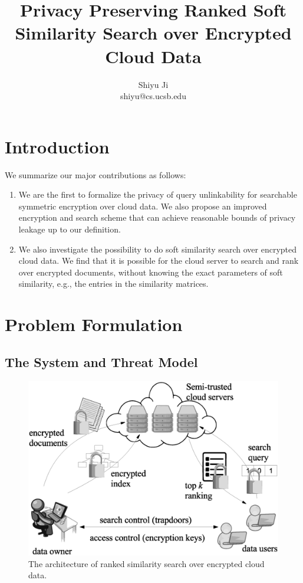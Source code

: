 \documentclass{IEEEtran}
\begin{document}
\title{\Large\bf Privacy Preserving Ranked Soft Similarity Search over Encrypted Cloud Data}
\author{Shiyu Ji\\ shiyu@cs.ucsb.edu}
\date{}
\maketitle

\newtheorem{definition}{Definition}
\theoremstyle{definition}
\newtheorem{theorem}{Theorem}
\theoremstyle{plain}
\newtheorem{lemma}{Lemma}
\theoremstyle{plain}
\newtheorem{corollary}{Corollary}
\theoremstyle{plain}

\section{Introduction}

We summarize our major contributions as follows:
\begin{enumerate}
\item We are the first to formalize the privacy of query unlinkability for searchable symmetric encryption over cloud data. We also propose an improved encryption and search scheme that can achieve reasonable bounds of privacy leakage up to our definition.
\item We also investigate the possibility to do soft similarity search over encrypted cloud data. We find that it is possible for the cloud server to search and rank over encrypted documents, without knowing the exact parameters of soft similarity, e.g., the entries in the similarity matrices.
\end{enumerate}

\section{Problem Formulation}
\subsection{The System and Threat Model}

\begin{figure}
\centering
\includegraphics[width=0.8\linewidth]{system_model.eps}
\caption{The architecture of ranked similarity search over encrypted cloud data.}
\label{fig:system_model}
\end{figure}
\end{document}
